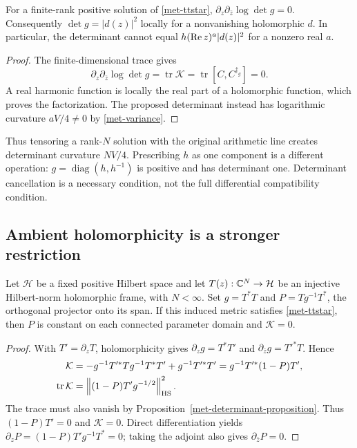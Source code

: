 \begin{proposition}
\label{met-determinant-proposition}
For a finite-rank positive solution of \eqref{met-ttstar},
$\partial_z\partial_{\bar z}\log\det g=0$.
Consequently $\det g=|d(z)|^2$ locally for a nonvanishing holomorphic $d$.
In particular, the determinant cannot equal
$h(\operatorname{Re} z)^a|d(z)|^2$ for a nonzero real $a$.
\end{proposition}
\begin{proof}
The finite-dimensional trace gives
\[
 \partial_z\partial_{\bar z}\log\det g
 =\operatorname{tr}\mathcal K
 =\operatorname{tr}[C,C^{\dagger_g}]=0.
\]
A real harmonic function is locally the real part of a holomorphic function,
which proves the factorization.  The proposed determinant instead has
logarithmic curvature $aV/4\ne0$ by \eqref{met-variance}.
\end{proof}

Thus tensoring a rank-$N$ solution with the original arithmetic line creates
determinant curvature $NV/4$.  Prescribing $h$ as one component is a different
operation: $g=\operatorname{diag}(h,h^{-1})$ is positive and has determinant
one.  Determinant cancellation is a necessary condition, not the full
differential compatibility condition.

\subsection{Ambient holomorphicity is a stronger restriction}
\label{met-ambient}

\begin{proposition}
\label{met-ambient-proposition}
Let $\mathcal H$ be a fixed positive Hilbert space and let
$T(z):\mathbb C^N\to\mathcal H$ be an injective Hilbert-norm holomorphic frame,
with $N<\infty$.  Set $g=T^*T$ and
$P=Tg^{-1}T^*$, the orthogonal projector onto its span.
If this induced metric satisfies \eqref{met-ttstar}, then $P$ is constant on
each connected parameter domain and $\mathcal K=0$.
\end{proposition}
\begin{proof}
With $T'=\partial_zT$, holomorphicity gives
$\partial_zg=T^*T'$ and $\partial_{\bar z}g=T'^*T$.  Hence
\begin{align}
 \mathcal K
 &=-g^{-1}T'^*Tg^{-1}T^*T'+g^{-1}T'^*T'
   =g^{-1}T'^*(1-P)T',
 \label{met-second-fundamental}\\
 \operatorname{tr}\mathcal K
 &=\left\lVert(1-P)T'g^{-1/2}\right\rVert_{\mathrm{HS}}^2.
 \label{met-positive-trace}
\end{align}
The trace must also vanish by Proposition~\ref{met-determinant-proposition}.
Thus $(1-P)T'=0$ and $\mathcal K=0$.  Direct differentiation yields
$\partial_zP=(1-P)T'g^{-1}T^*=0$; taking the adjoint also gives
$\partial_{\bar z}P=0$.
\end{proof}

